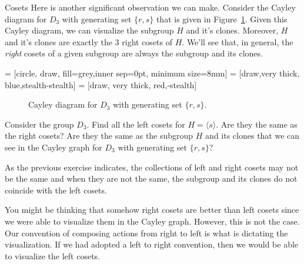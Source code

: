 \begin{section}{Cosets}
Here is another significant observation we can make.  Consider the Cayley diagram for $D_3$ with generating set $\{r,s\}$ that is given in Figure~\ref{fig:D3_repeat}. Given this Cayley diagram, we can visualize the subgroup $H$ and it's clones.  Moreover, $H$ and it's clones are exactly the 3 right cosets of $H$.  We'll see that, in general, the \emph{right} cosets of a given subgroup are always the subgroup and its clones.

 = [circle, draw, fill=grey,inner sep=0pt, minimum size=8mm]
 = [draw,very  thick, blue,stealth-stealth]
 = [draw, very thick, red,-stealth]

\begin{figure}[!ht]
\centering
{}
\caption{Cayley diagram for $D_3$ with generating set $\{r,s\}$.}
\label{fig:D3_repeat}
\end{figure}

\begin{exercise}\label{exer:left_cosets_D3}
Consider the group $D_3$.  Find all the left cosets for $H=\langle s\rangle$.  Are they the same as the right cosets?  Are they the same as the subgroup $H$ and its clones that we can see in the Cayley graph for $D_3$ with generating set $\{r,s\}$?
\end{exercise}

As the previous exercise indicates, the collections of left and right cosets may not be the same and when they are not the same, the subgroup and its clones do not coincide with the left cosets.

You might be thinking that somehow right cosets are better than left cosets since we were able to visualize them in the Cayley graph.  However, this is not the case.  Our convention of composing actions from right to left is what is dictating the visualization.  If we had adopted a left to right convention, then we would be able to visualize the left cosets.  


\end{section}
